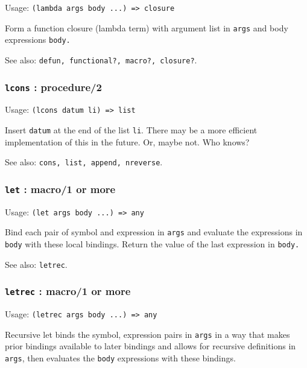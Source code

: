 \documentclass[
]{article}
\newcommand{\passthrough}[1]{#1}
\begin{document}
Usage: \passthrough{\lstinline!(lambda args body ...) => closure!}

Form a function closure (lambda term) with argument list in
\passthrough{\lstinline!args!} and body expressions
\passthrough{\lstinline!body.!}

See also:
\passthrough{\lstinline!defun, functional?, macro?, closure?!}.

\hypertarget{lcons-procedure2}{%
\subsubsection{\texorpdfstring{\texttt{lcons} :
procedure/2}{lcons : procedure/2}}\label{lcons-procedure2}}

Usage: \passthrough{\lstinline!(lcons datum li) => list!}

Insert \passthrough{\lstinline!datum!} at the end of the list
\passthrough{\lstinline!li!}. There may be a more efficient
implementation of this in the future. Or, maybe not. Who knows?

See also: \passthrough{\lstinline!cons, list, append, nreverse!}.

\hypertarget{let-macro1-or-more}{%
\subsubsection{\texorpdfstring{\texttt{let} : macro/1 or
more}{let : macro/1 or more}}\label{let-macro1-or-more}}

Usage: \passthrough{\lstinline!(let args body ...) => any!}

Bind each pair of symbol and expression in
\passthrough{\lstinline!args!} and evaluate the expressions in
\passthrough{\lstinline!body!} with these local bindings. Return the
value of the last expression in \passthrough{\lstinline!body.!}

See also: \passthrough{\lstinline!letrec!}.

\hypertarget{letrec-macro1-or-more}{%
\subsubsection{\texorpdfstring{\texttt{letrec} : macro/1 or
more}{letrec : macro/1 or more}}\label{letrec-macro1-or-more}}

Usage: \passthrough{\lstinline!(letrec args body ...) => any!}

Recursive let binds the symbol, expression pairs in
\passthrough{\lstinline!args!} in a way that makes prior bindings
available to later bindings and allows for recursive definitions in
\passthrough{\lstinline!args!}, then evaluates the
\passthrough{\lstinline!body!} expressions with these bindings.
\end{document}
